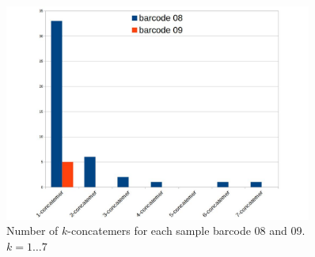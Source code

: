 \begin{figure}[!ht]
\centerline{\includegraphics[width=0.9\textwidth]{images/concat_count.jpg}}
\caption[Concatemer reads count]{Number of $k$-concatemers for each sample barcode 08 and 09. $k=1\dots 7$}
\label{supp_fig:concat_count}
\end{figure}

